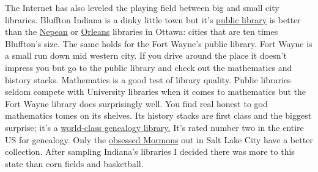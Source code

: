 The Internet has also leveled the playing field between big and small
city libraries. Bluffton Indiana is a dinky little town but it's
\href{http://www.blufftonpubliclibrary.org/}{public library} is better
than the
\href{http://www.libdex.com/country/canada/ontario/nepean/library\_33680.html}{Nepean}
or
\href{http://www.libdex.com/country/canada/ontario/orleans/library\_24028.html}{Orleans}
libraries in Ottawa: cities that are ten times Bluffton's size. The same
holds for the Fort Wayne's public library. Fort Wayne is a small run
down mid western city. If you drive around the place it doesn't impress
you but go to the public library and check out the mathematics and
history stacks. Mathematics is a good test of library quality. Public
libraries seldom compete with University libraries when it comes to
mathematics but the Fort Wayne library does surprisingly well. You find
real honest to god mathematics tomes on its shelves. Its history stacks
are first class and the biggest surprise; it's a
\href{http://www.acpl.lib.in.us/genealogy/}{world-class genealogy
library.} It's rated number two in the entire US for genealogy. Only the
\href{http://www.ancestorhunt.com/mormon\_church\_records.htm}{obsessed
Mormons} out in Salt Lake City have a better collection. After sampling
Indiana's libraries I decided there was more to this state than corn
fields and basketball.




%